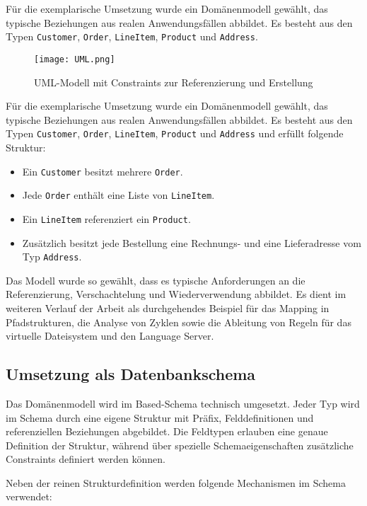 Für die exemplarische Umsetzung wurde ein Domänenmodell gewählt, das typische Beziehungen aus realen Anwendungsfällen abbildet. Es besteht aus den Typen \texttt{Customer}, \texttt{Order}, \texttt{LineItem}, \texttt{Product} und \texttt{Address}.

\begin{figure}[H]
  \centering
  \texttt{[image: UML.png]}
  \caption{UML-Modell mit Constraints zur Referenzierung und Erstellung}
  \label{fig:uml_modell}
\end{figure}


Für die exemplarische Umsetzung wurde ein Domänenmodell gewählt, das typische Beziehungen aus realen Anwendungsfällen abbildet. Es besteht aus den Typen \texttt{Customer}, \texttt{Order}, \texttt{LineItem}, \texttt{Product} und \texttt{Address} und erfüllt folgende Struktur:

\begin{itemize}
  \item Ein \texttt{Customer} besitzt mehrere \texttt{Order}.
  \item Jede \texttt{Order} enthält eine Liste von \texttt{LineItem}.
  \item Ein \texttt{LineItem} referenziert ein \texttt{Product}.
  \item Zusätzlich besitzt jede Bestellung eine Rechnungs- und eine Lieferadresse vom Typ \texttt{Address}.
\end{itemize}

Das Modell wurde so gewählt, dass es typische Anforderungen an die Referenzierung, Verschachtelung und Wiederverwendung abbildet. Es dient im weiteren Verlauf der Arbeit als durchgehendes Beispiel für das Mapping in Pfadstrukturen, die Analyse von Zyklen sowie die Ableitung von Regeln für das virtuelle Dateisystem und den Language Server.

\subsection{Umsetzung als Datenbankschema}

Das Domänenmodell wird im Based-Schema technisch umgesetzt. Jeder Typ wird im Schema durch eine eigene Struktur mit Präfix, Felddefinitionen und referenziellen Beziehungen abgebildet. Die Feldtypen erlauben eine genaue Definition der Struktur, während über spezielle Schemaeigenschaften zusätzliche Constraints definiert werden können.

Neben der reinen Strukturdefinition werden folgende Mechanismen im Schema verwendet:

